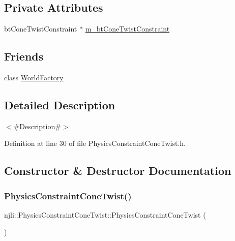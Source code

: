 \subsection*{Private Attributes}
\begin{DoxyCompactItemize}
\item 
bt\+Cone\+Twist\+Constraint $\ast$ \mbox{\hyperlink{classnjli_1_1_physics_constraint_cone_twist_a9a2b6ba85104cb0aacc840dfa28625cf}{m\+\_\+bt\+Cone\+Twist\+Constraint}}
\end{DoxyCompactItemize}
\subsection*{Friends}
\begin{DoxyCompactItemize}
\item 
class \mbox{\hyperlink{classnjli_1_1_physics_constraint_cone_twist_acb96ebb09abe8f2a37a915a842babfac}{World\+Factory}}
\end{DoxyCompactItemize}


\subsection{Detailed Description}
$<$\#\+Description\#$>$ 

Definition at line 30 of file Physics\+Constraint\+Cone\+Twist.\+h.



\subsection{Constructor \& Destructor Documentation}
\mbox{\label{classnjli_1_1_physics_constraint_cone_twist_a947d157eba75740eb5ef4cd2a2d84fa7}} 
\subsubsection{\texorpdfstring{Physics\+Constraint\+Cone\+Twist()}{PhysicsConstraintConeTwist()}\hspace{0.1cm}{\footnotesize\ttfamily [1/3]}}
{\footnotesize\ttfamily njli\+::\+Physics\+Constraint\+Cone\+Twist\+::\+Physics\+Constraint\+Cone\+Twist (\begin{DoxyParamCaption}{ }\end{DoxyParamCaption})\hspace{0.3cm}{\ttfamily [protected]}}

